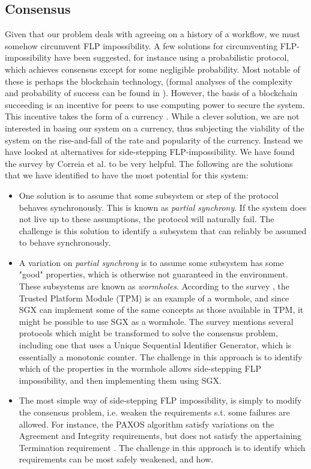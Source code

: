 \documentclass[12pt]{article}
\begin{document}
		\subsection{Consensus}
		Given that our problem deals with agreeing on a history of a workflow, we must somehow circumvent FLP impossibility.
		A few solutions for circumventing FLP-impossibility have been suggested, for instance using a probabilistic protocol, which achieves consensus except for some negligible probability. Most notable of these is perhaps the blockchain technology, (formal analyses of the complexity and probability of success can be found in \cite{miller2014anonymous}). However, the basis of a blockchain succeeding is an incentive for peers to use computing power to secure the system. This incentive takes the form of a currency \cite{bitcoin-white-paper}. While a clever solution, we are not interested in basing our system on a currency, thus subjecting the viability of the system on the rise-and-fall of the rate and popularity of the currency. Instead we have looked at alternatives for side-stepping FLP-impossibility. We have found the survey by Correia et al. \cite{consensus-survey} to be very helpful. The following are the solutions that we have identified to have the most potential for this system:
		\begin{itemize}
			\item One solution is to assume that some subsystem or step of the protocol behaves synchronously. This is known as \textit{partial synchrony}. If the system does not live up to these assumptions, the protocol will naturally fail. The challenge is this solution to identify a subsystem that can reliably be assumed to behave synchronously. 
			\item A variation on \textit{partial synchrony} is to assume some subsystem has some "good" properties, which is otherwise not guaranteed in the environment. These subsystems are known as \textit{wormholes}. According to the survey \cite{consensus-survey}, the Trusted Platform Module (TPM) is an example of a wormhole, and since SGX can implement some of the same concepts as those available in TPM, it might be possible to use SGX as a wormhole. The survey mentions several protocols which might be transformed to solve the consensus problem, including one that uses a Unique Sequential Identifier Generator, which is essentially a monotonic counter. The challenge in this approach is to identify which of the properties in the wormhole allows side-stepping FLP impossibility, and then implementing them using SGX.
			\item The most simple way of side-stepping FLP impossibility, is simply to modify the consensus problem, i.e. weaken the requirements s.t. some failures are allowed. For instance, the PAXOS algorithm \cite{paxos} satisfy variations on the Agreement and Integrity requirements, but does not satisfy the appertaining Termination requirement \cite{fast-byz-cons}. The challenge in this approach is to identify which requirements can be most safely weakened, and how.
		\end{itemize}
		
\end{document}
